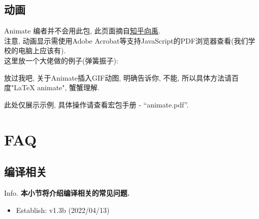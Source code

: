 \documentclass[hyperref, UTF8, CJK, aspectratio=169]{beamer}
\begin{document}
\subsection{动画}
\begin{frame}{Animate}
	编者并不会用此包, 此页面摘自\href{https://zhuanlan.zhihu.com/p/338402487}{\color{univblue}知乎向禹}.\\
	注意, 动画显示需使用Adobe Acrobat等支持JavaScript的PDF浏览器查看(我们学校的电脑上应该有).\\
	这里放一个大佬做的例子(弹簧振子):
	\begin{center}
		\begin{animateinline}[loop]{20}%
		\end{animateinline}
	\end{center}
	放过我吧, 关于Animate插入GIF动图, 明确告诉你, 不能, 所以具体方法请百度"LaTeX animate", 蟹蟹理解.\par
	\color{univgreen}此处仅展示示例, 具体操作请查看宏包手册 - ``animate.pdf''.
\end{frame}

\section{FAQ}
\subsection{编译相关}
\begin{frame}{Info.}
  \textbf{本小节将介绍编译相关的常见问题.}
  \begin{multicols}{2}
    \begin{itemize}
      \item Establish: \textcolor{univgreen}{v1.3b (2022/04/13)}
    \end{itemize}
  \end{multicols}
  \mycopyright
\end{frame}
\end{document}
